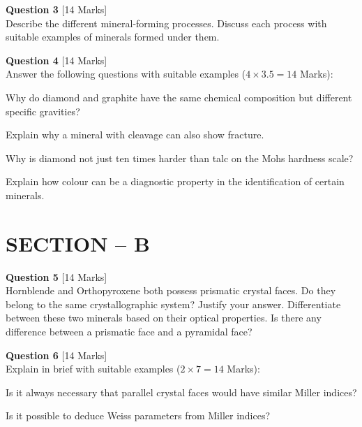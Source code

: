 \documentclass[11pt,a4paper]{article}
\begin{document}
\bigskip




\noindent   \textbf{Question 3} \hfill [14 Marks]\\
Describe the different mineral-forming processes. Discuss each process with suitable examples of minerals formed under them.

\bigskip




\noindent   \textbf{Question 4} \hfill [14 Marks]\\
Answer the following questions with suitable examples ($4  \times 3.5 = 14$ Marks):

\begin{parts}
  \item Why do diamond and graphite have the same chemical composition but different specific gravities?
  \item Explain why a mineral with cleavage can also show fracture.
  \item Why is diamond not just ten times harder than talc on the Mohs hardness scale?
  \item Explain how colour can be a diagnostic property in the identification of certain minerals.
\end{parts}

\bigskip
\section*{SECTION -- B}




\noindent   \textbf{Question 5} \hfill [14 Marks]\\
Hornblende and Orthopyroxene both possess prismatic crystal faces. Do they belong to the same crystallographic system? Justify your answer. Differentiate between these two minerals based on their optical properties. Is there any difference between a prismatic face and a pyramidal face?

\bigskip




\noindent   \textbf{Question 6} \hfill [14 Marks]\\
Explain in brief with suitable examples ($2  \times 7 = 14$ Marks):

\begin{parts}
  \item Is it always necessary that parallel crystal faces would have similar Miller indices?
  \item Is it possible to deduce Weiss parameters from Miller indices?
\end{parts}
\end{document}
